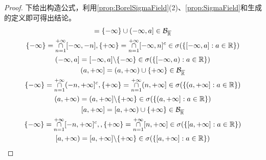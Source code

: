 \begin{proof}
	下给出构造公式，利用\cref{prop:BorelSigmaField}(2)、\cref{prop:SigmaField}和生成的定义即可得出结论。
	\begin{gather*}
		[-\infty,a)=\{-\infty\}\cup(-\infty,a)\in\mathcal{B}_{\overline{\mathbb{R}}} \\
		\{-\infty\}=\underset{n=1}{\overset{+\infty}{\cap}}[-\infty, -n),\{+\infty\}=\underset{n=1}{\overset{+\infty}{\cap}}[-\infty,n)^c\in\sigma(\{[-\infty,a):a\in\mathbb{R}\}) \\
		(-\infty, a)=[-\infty,a)\backslash\{-\infty\}\in\sigma(\{[-\infty,a):a\in\mathbb{R}\}) \\
		[-\infty,a]=\{-\infty\}\cup(-\infty,a]\in\mathcal{B}_{\overline{\mathbb{R}}} \\
		\{-\infty\}=\underset{n=1}{\overset{+\infty}{\cap}}[-\infty,-n],\{+\infty\}=\underset{n=1}{\overset{+\infty}{\cap}}[-\infty,n]^c\in\sigma(\{[-\infty,a]:a\in\mathbb{R}\}) \\
		(-\infty,a]=[-\infty,a]\backslash\{-\infty\}\in\sigma(\{[-\infty,a):a\in\mathbb{R}\}) \\
		(a,+\infty]=(a,+\infty)\cup\{+\infty\}\in\mathcal{B}_{\overline{\mathbb{R}}} \\
		\{-\infty\}=\underset{n=1}{\overset{+\infty}{\cap}}(-n,+\infty]^c,\{+\infty\}=\underset{n=1}{\overset{+\infty}{\cap}}(n,+\infty]\in\sigma(\{(a,+\infty]:a\in\mathbb{R}\}) \\
		(a,+\infty)=(a,+\infty]\backslash\{+\infty\}\in\sigma(\{(a,+\infty]:a\in\mathbb{R}\}) \\
		[a,+\infty]=[a,+\infty)\cup\{+\infty\}\in\mathcal{B}_{\overline{\mathbb{R}}} \\
		\{-\infty\}=\underset{n=1}{\overset{+\infty}{\cap}}[-n,+\infty]^c,,\{+\infty\}=\underset{n=1}{\overset{+\infty}{\cap}}[n,+\infty]\in\sigma(\{[a,+\infty]:a\in\mathbb{R}\}) \\
		[a,+\infty)=[a,+\infty]\backslash\{+\infty\}\in\sigma(\{[a,+\infty]:a\in\mathbb{R}\})\qedhere
	\end{gather*}
\end{proof}



